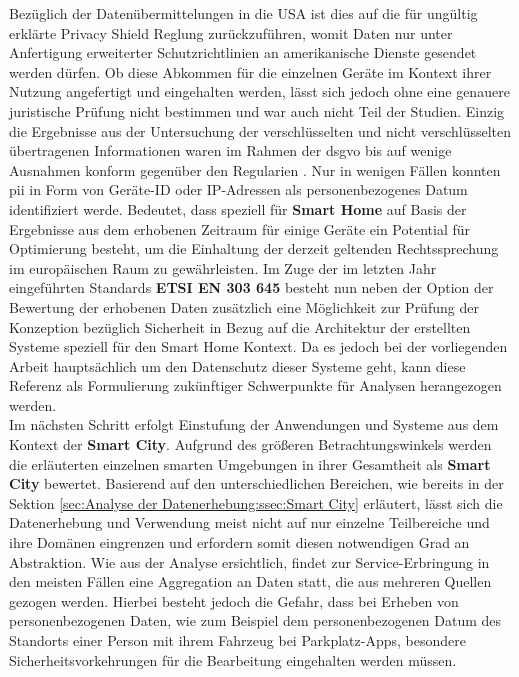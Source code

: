 Bezüglich der Datenübermittelungen in die USA ist dies auf die für ungültig erklärte Privacy Shield Reglung \cite{Dsgvo2016} zurückzuführen, womit Daten nur unter Anfertigung erweiterter Schutzrichtlinien an amerikanische Dienste gesendet werden dürfen. Ob diese Abkommen für die einzelnen Geräte im Kontext ihrer Nutzung angefertigt und eingehalten werden, lässt sich jedoch ohne eine genauere juristische Prüfung nicht bestimmen und war auch nicht Teil der Studien. 
Einzig die Ergebnisse aus der Untersuchung der verschlüsselten und nicht verschlüsselten übertragenen Informationen waren im Rahmen der \ac{dsgvo} bis auf wenige Ausnahmen konform gegenüber den Regularien \cite{Ren2019}. Nur in wenigen Fällen konnten \ac{pii} in Form von Geräte-ID oder IP-Adressen als personenbezogenes Datum identifiziert werde.
Bedeutet, dass speziell für \textbf{Smart Home} auf Basis der Ergebnisse aus dem erhobenen Zeitraum für einige Geräte ein Potential für Optimierung besteht, um die Einhaltung der derzeit geltenden Rechtssprechung im europäischen Raum zu gewährleisten.
Im Zuge der im letzten Jahr eingeführten Standards \textbf{ETSI EN 303 645} \cite{ETSI2020} besteht nun neben der Option der Bewertung der erhobenen Daten zusätzlich eine Möglichkeit zur Prüfung der Konzeption bezüglich Sicherheit in Bezug auf die Architektur der erstellten Systeme speziell für den Smart Home Kontext. Da es jedoch bei der vorliegenden Arbeit hauptsächlich um den Datenschutz dieser Systeme geht, kann diese Referenz als Formulierung zukünftiger Schwerpunkte für Analysen herangezogen werden.\\
Im nächsten Schritt erfolgt Einstufung der Anwendungen und Systeme aus dem Kontext der \textbf{Smart City}. Aufgrund des größeren Betrachtungswinkels werden die erläuterten einzelnen smarten Umgebungen in ihrer Gesamtheit als \textbf{Smart City} bewertet. Basierend auf den unterschiedlichen Bereichen, wie bereits in der Sektion \ref{sec:Analyse der Datenerhebung:ssec:Smart City} erläutert, lässt sich die Datenerhebung und Verwendung meist nicht auf nur einzelne Teilbereiche und ihre Domänen eingrenzen und erfordern somit diesen notwendigen Grad an Abstraktion.
Wie aus der Analyse \cite{BCG2020} ersichtlich, findet zur Service-Erbringung in den meisten Fällen eine Aggregation an Daten statt, die aus mehreren Quellen gezogen werden. Hierbei besteht jedoch die Gefahr, dass bei Erheben von personenbezogenen Daten, wie zum Beispiel dem personenbezogenen Datum des Standorts einer Person mit ihrem Fahrzeug bei Parkplatz-Apps, besondere Sicherheitsvorkehrungen für die Bearbeitung eingehalten werden müssen.
